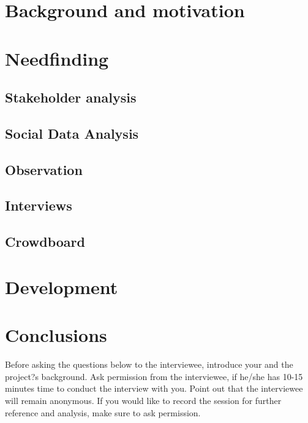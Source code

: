 \documentclass[english]{tktltiki}
\begin{document}
\section{Background and motivation}


\section{Needfinding}
\subsection{Stakeholder analysis}


\subsection{Social Data Analysis}


\subsection{Observation}


\subsection{Interviews}


\subsection{Crowdboard}
\label{sec:crowdboard}


\section{Development}
\label{sec:development}


\section{Conclusions}
\label{sec:conclusions}


\pagebreak
\nocite{*}




\lastpage
\appendices
\pagestyle{empty}
\singlespacing

\label{sec:interview-questions}
Before asking the questions below to the interviewee, introduce your and the project?s background. Ask permission from the interviewee, if he/she has 10-15 minutes time to conduct the interview with you. Point out that the interviewee will remain anonymous. If you would like to record the session for further reference and analysis, make sure to ask permission.
\end{document}
